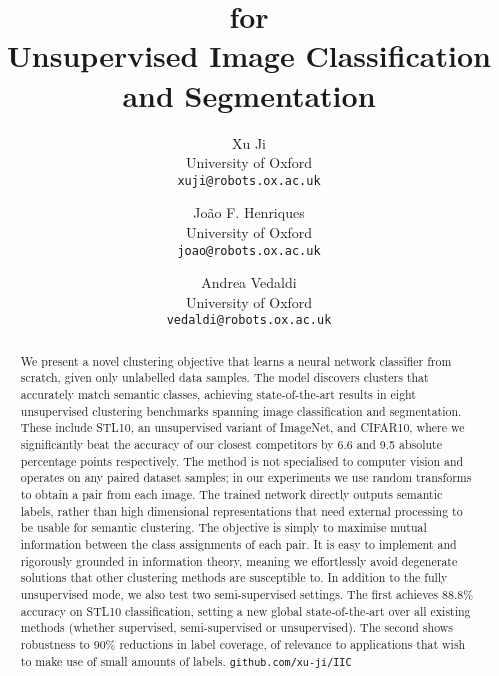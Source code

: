 \documentclass[10pt,twocolumn,letterpaper]{article}
\title{\methodname for \\ Unsupervised Image Classification and Segmentation}
\author{Xu Ji\\
University of Oxford\\
{\tt\small xuji@robots.ox.ac.uk}
\and
Jo\~ao F. Henriques\\
University of Oxford\\
{\tt\small joao@robots.ox.ac.uk}
\and
Andrea Vedaldi\\
University of Oxford\\
{\tt\small vedaldi@robots.ox.ac.uk}}
\begin{document}
\maketitle
\begin{abstract}

We present a novel clustering objective that learns a neural network classifier from scratch, given only unlabelled data samples.
The model discovers clusters that accurately match semantic classes, achieving state-of-the-art results in eight unsupervised clustering benchmarks spanning image classification and segmentation.
These include STL10, an unsupervised variant of ImageNet, and CIFAR10, where we significantly beat the accuracy of our closest competitors by 6.6 and 9.5 absolute percentage points respectively.
The method is not specialised to computer vision and operates on any paired dataset samples; in our experiments we use random transforms to obtain a pair from each image. 
The trained network directly outputs semantic labels, rather than high dimensional representations that need external processing to be usable for semantic clustering.
The objective is simply to maximise mutual information between the class assignments of each pair.
It is easy to implement and rigorously grounded in information theory, meaning we effortlessly avoid degenerate solutions that other clustering methods are susceptible to.
In addition to the fully unsupervised mode, we also test two semi-supervised settings. The first achieves 88.8\% accuracy on STL10 classification, setting a new global state-of-the-art over all existing methods (whether supervised, semi-supervised or unsupervised).
The second shows robustness to 90\% reductions in label coverage, of relevance to applications that wish to make use of small amounts of labels. \lstinline[basicstyle=\ttfamily]{github.com/xu-ji/IIC} 


\end{abstract}
\end{document}
